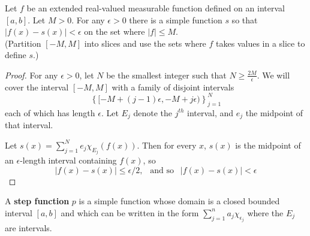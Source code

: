 \pagebreak
\begin{pblm}\label{p:contalmostsimple}%
	Let $f$ be an extended real-valued measurable function defined on an 
	interval $[a,b]$. Let $M > 0$. For any $\epsilon > 0$ there is a simple 
	function $s$ so that $|f(x) - s(x)| < \epsilon$ on the set where $|f| 
	\le M$. \\ (Partition $[-M,M]$ into slices and use the sets where $f$ 
	takes values in a slice to define $s$.)
\begin{proof}
	For any $\epsilon > 0$, let $N$ be the smallest integer such that 
	$N \ge \frac{2M}{\epsilon}$. 
	We will cover the interval $[-M,M]$ with a family of disjoint intervals 
	\begin{equation*}
		\left\{[ -M+(j-1)\epsilon, -M + j\epsilon )\right\}_{j=1}^N
	\end{equation*} 
	each of which has length 
	$\epsilon$. Let $E_j$ denote the $j^{th}$ interval, and $e_j$ the midpoint of that 
	interval. 

	Let $s(x) = \sum\limits_{j=1}^N e_j\chi_{E_j}(f(x))$. Then for every $x$, 
	$s(x)$ is the midpoint of an $\epsilon$-length interval containing $f(x)$, so 
	\begin{equation*}
		|f(x) - s(x)| \le \epsilon/2,~~\text{ and so }~~|f(x) - s(x)| < \epsilon
	\end{equation*}
\end{proof}
\end{pblm}

\begin{defn}\label{d:stepfunction}%
	A \textbf{step function} $p$ is a simple function whose domain is a closed 
	bounded interval $[a,b]$ and which can be written in the form 
	$\sum_{j=1}^n a_j\chi_{\epsilon_j}$ where the $E_j$ are intervals. 
\end{defn}

